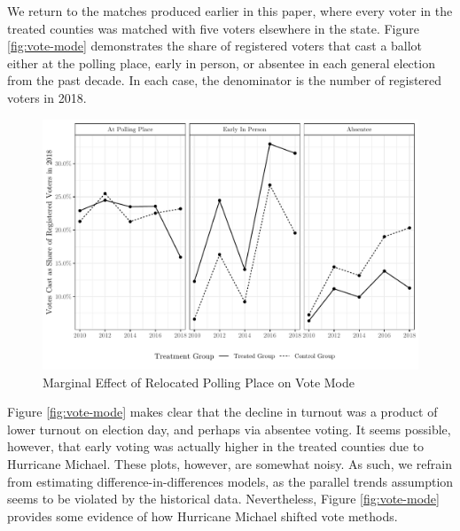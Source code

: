 \documentclass[
  12pt,
]{article}
\begin{document}
We return to the matches produced earlier in this paper, where every voter in the treated counties was matched with five voters elsewhere in the state. Figure \ref{fig:vote-mode} demonstrates the share of registered voters that cast a ballot either at the polling place, early in person, or absentee in each general election from the past decade. In each case, the denominator is the number of registered voters in 2018.

\begin{figure}[H]

{\centering \includegraphics{hurricane_michael_files/figure-latex/vote-mode-chunk-1} 

}

\caption{\label{fig:vote-mode}Marginal Effect of Relocated Polling Place on Vote Mode}\label{fig:vote-mode-chunk}
\end{figure}

Figure \ref{fig:vote-mode} makes clear that the decline in turnout was a product of lower turnout on election day, and perhaps via absentee voting. It seems possible, however, that early voting was actually higher in the treated counties due to Hurricane Michael. These plots, however, are somewhat noisy. As such, we refrain from estimating difference-in-differences models, as the parallel trends assumption seems to be violated by the historical data. Nevertheless, Figure \ref{fig:vote-mode} provides some evidence of how Hurricane Michael shifted vote methods.
\end{document}
